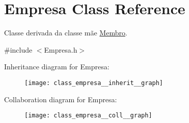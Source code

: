 \hypertarget{class_empresa}{\section{Empresa Class Reference}
\label{class_empresa}
}


Classe derivada da classe mãe \hyperlink{class_membro}{Membro}.  




{\ttfamily \#include $<$Empresa.\+h$>$}



Inheritance diagram for Empresa\+:\nopagebreak
\begin{figure}[H]
\begin{center}
\leavevmode
\texttt{[image: class\_empresa\_\_inherit\_\_graph]}
\end{center}
\end{figure}


Collaboration diagram for Empresa\+:\nopagebreak
\begin{figure}[H]
\begin{center}
\leavevmode
\texttt{[image: class\_empresa\_\_coll\_\_graph]}
\end{center}
\end{figure}
